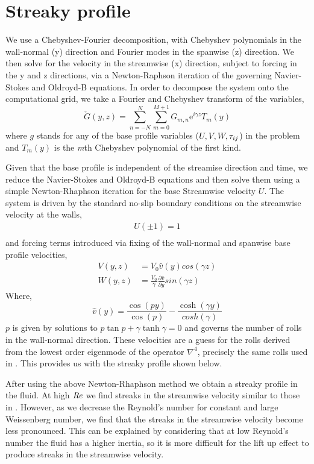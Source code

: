 \documentclass{jfm}
\newcommand{\dy}[1]{\frac{\partial #1}{\partial y}}
\newcommand{\me}{\mathrm{e}}
\newcommand\Rey{\mbox{\textit{Re}}}  %
\begin{document}
\section{Streaky profile}\label{sec:streaks}

We use a Chebyshev-Fourier decomposition, with Chebyshev polynomials in the wall-normal (y) direction and Fourier modes in the spanwise (z) direction. We then solve for the velocity in the streamwise (x) direction, subject to forcing in the y and z directions, via a Newton-Raphson iteration of the governing Navier-Stokes and Oldroyd-B equations. In order to decompose the system onto the computational grid, we take a Fourier and Chebyshev transform of the variables,
\begin{equation}
    \check{G}(y,z) = \sum_{n=-N}^{N} \sum_{m=0}^{M+1} G_{m,n} \me^{i\gamma z} T_{m}(y) \label{eq:decomp}
\end{equation}
where $g$ stands for any of the base profile variables ($U,V,W,\boldmath{\tau}_{ij}$) in the problem and $T_{m}(y)$ is the \textit{m}th Chebyshev polynomial of the first kind.

Given that the base profile is independent of the streamise direction and time, we reduce the Navier-Stokes and Oldroyd-B equations and then solve them using a simple Newton-Rhaphson iteration for the base Streamwise velocity $U$. The system is driven by the standard no-slip boundary conditions on the streamwise velocity at the walls,
\begin{align}
    U(\pm 1) = 1 \\
\end{align}
and forcing terms introduced via fixing of the wall-normal and spanwise base profile velocities,
\begin{align}
    V(y,z) &= V_0 \hat{v}(y) cos(\gamma z) \\
    W(y,z) &= \frac{V_0}{\gamma} \dy{\hat{v}} sin(\gamma z) 
\end{align}
Where,
\begin{equation}
    \hat{v}(y) = \frac{\cos(py)}{\cos(p)} - \frac{\cosh(\gamma y)}{cosh(\gamma)} 
\end {equation}
$p$ is given by solutions to $p\tan p + \gamma \tanh \gamma = 0$ and governs the number of rolls in the wall-normal direction. These velocities are a guess for the rolls derived from the lowest order eigenmode of the operator $\nabla^{4}$, precisely the same rolls used in \cite{Waleffe97}. This provides us with the streaky profile shown below.

After using the above Newton-Rhaphson method we obtain a streaky profile in the fluid. At high $\Rey$ we find streaks in the streamwise velocity similar to those in \cite{Waleffe1997}. However, as we decrease the Reynold's number for constant and large Weissenberg number, we find that the streaks in the streamwise velocity become less pronounced. This can be explained by considering that at low Reynold's number the fluid has a higher inertia, so it is more difficult for the lift up effect to produce streaks in the streamwise velocity. 
\end{document}
